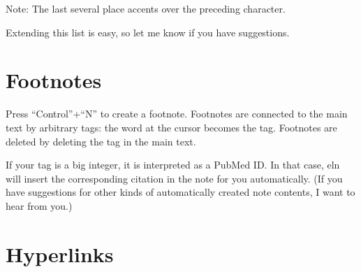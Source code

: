 \documentclass[11pt]{report}
\begin{document}
\bigskip

\noindent Note: The last several place accents over the preceding character.

Extending this list is easy, so let me know if you have suggestions.

\section{Footnotes}

Press ``Control''+``N'' to create a footnote. Footnotes are connected
to the main text by arbitrary tags: the word at the cursor
becomes the tag. Footnotes are deleted by deleting the tag in the main
text.

If your tag is a big integer, it is interpreted as a PubMed ID. In
that case, eln will insert the corresponding citation in the note for
you automatically. (If you have suggestions for other kinds of
automatically created note contents, I want to hear from you.)

\section{Hyperlinks}
\end{document}
